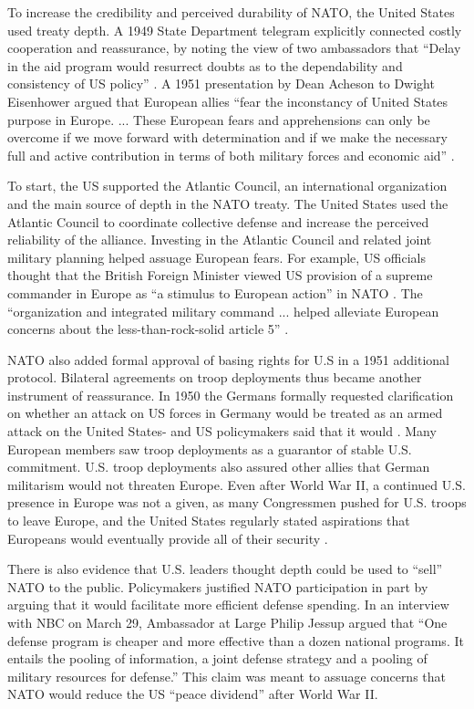 \documentclass[12pt]{article}
\begin{document}
To increase the credibility and perceived durability of NATO, the United States used treaty depth.  
A 1949 State Department telegram explicitly connected costly cooperation and reassurance, by noting the view of two ambassadors that ``Delay in the aid program would resurrect doubts as to the dependability and consistency of US policy'' \citep{state-summary-0607-49}. 
A 1951 presentation by Dean Acheson to Dwight Eisenhower argued that European allies ``fear the inconstancy of United States purpose in Europe. ... These European fears and apprehensions can only be overcome if we move forward with determination and if we make the necessary full and active contribution in terms of both military forces and economic aid'' \citep[pg. 3]{Acheson1951}. 


To start, the US supported the Atlantic Council, an international organization and the main source of depth in the NATO treaty. 
The United States used the Atlantic Council to coordinate collective defense and increase the perceived reliability of the alliance. 
Investing in the Atlantic Council and related joint military planning helped assuage European fears. 
For example, US officials thought that the British Foreign Minister viewed US provision of a supreme commander in Europe as ``a stimulus to European action'' in NATO \citep{Acheson1950}. 
The ``organization and integrated military command ... helped alleviate European concerns about the less-than-rock-solid article 5'' \citep[pg. 26]{Sayle2019}.


NATO also added formal approval of basing rights for U.S in a 1951 additional protocol.  
Bilateral agreements on troop deployments thus became another instrument of reassurance. 
In 1950 the Germans formally requested clarification on whether an attack on US forces in Germany would be treated as an armed attack on the United States- and US policymakers said that it would \citep[pg. 395]{Acheson1969}.  
Many European members saw troop deployments as a guarantor of stable U.S. commitment. 
U.S. troop deployments also assured other allies that German militarism would not threaten Europe. 
Even after World War II, a continued U.S. presence in Europe was not a given, as many Congressmen pushed for U.S. troops to leave Europe, and the United States regularly stated aspirations that Europeans would eventually provide all of their security \citep[pg. 20]{Sayle2019}. 


There is also evidence that U.S. leaders thought depth could be used to ``sell'' NATO to the public. 
Policymakers justified NATO participation in part by arguing that it would facilitate more efficient defense spending. 
In an interview with NBC on March 29, Ambassador at Large Philip Jessup argued that ``One defense program is cheaper and more effective than a dozen national programs. It entails the pooling of information, a joint defense strategy and a pooling of military resources for defense.''
This claim was meant to assuage concerns that NATO would reduce the US ``peace dividend'' after World War II. 
\end{document}
